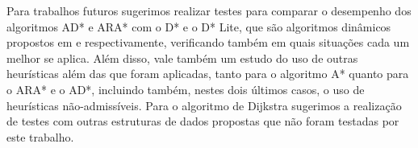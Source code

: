 Para trabalhos futuros sugerimos realizar testes para comparar o desempenho dos algoritmos AD* e ARA* com o D* e o D* Lite, que são algoritmos dinâmicos propostos em  e  respectivamente, verificando também em quais situações cada um melhor se aplica. Além disso, vale também um estudo do uso de outras heurísticas além das que foram aplicadas, tanto para o algoritmo A* quanto para o ARA* e o AD*, incluindo também, nestes dois últimos casos, o uso de heurísticas não-admissíveis. Para o algoritmo de Dijkstra sugerimos a realização de testes com outras estruturas de dados propostas que não foram testadas por este trabalho.